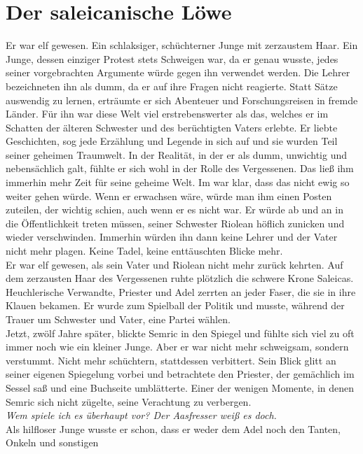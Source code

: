 
\chapter{Der saleicanische Löwe}
Er war elf gewesen. Ein schlaksiger, schüchterner Junge mit zerzaustem Haar. Ein Junge, dessen 
einziger Protest stets Schweigen war, da er genau wusste, jedes seiner vorgebrachten Argumente würde 
gegen ihn verwendet werden. Die Lehrer bezeichneten ihn als dumm, da er auf ihre Fragen nicht 
reagierte. Statt Sätze auswendig zu lernen, erträumte er sich Abenteuer und Forschungsreisen in 
fremde Länder. Für ihn war diese Welt viel erstrebenswerter als das, welches er im Schatten der 
älteren Schwester und des berüchtigten Vaters erlebte. Er liebte Geschichten, sog jede Erzählung und 
Legende in sich auf und sie wurden Teil seiner geheimen Traumwelt. In der Realität, in der er als 
dumm, unwichtig und nebensächlich galt, fühlte er sich wohl in der Rolle des Vergessenen. Das ließ 
ihm immerhin mehr Zeit für seine geheime Welt. Im war klar, dass das nicht ewig so weiter gehen 
würde. Wenn er erwachsen wäre, würde man ihm einen Posten zuteilen, der wichtig schien, auch wenn er 
es nicht war. Er würde ab und an in die Öffentlichkeit treten müssen, seiner Schwester Riolean 
höflich zunicken und wieder verschwinden. Immerhin würden ihn dann keine Lehrer und der Vater nicht 
mehr plagen. Keine Tadel, keine enttäuschten Blicke mehr.\\
Er war elf gewesen, als sein Vater und Riolean nicht mehr zurück kehrten. Auf dem zerzausten Haar 
des Vergessenen ruhte plötzlich die schwere Krone Saleicas. Heuchlerische Verwandte, Priester und 
Adel zerrten an jeder Faser, die sie in ihre Klauen bekamen. Er wurde zum Spielball der Politik und 
musste, während der Trauer um Schwester und Vater, eine Partei wählen.\\
Jetzt, zwölf Jahre später, blickte Semric in den Spiegel und fühlte sich viel zu oft immer noch wie 
ein kleiner Junge. Aber er war nicht mehr schweigsam, sondern verstummt. Nicht mehr schüchtern, 
stattdessen verbittert. Sein Blick glitt an seiner eigenen Spiegelung vorbei und betrachtete den 
Priester, der gemächlich im Sessel saß und eine Buchseite umblätterte. Einer der wenigen Momente, 
in denen Semric sich nicht zügelte, seine Verachtung zu verbergen. \\
\textit{Wem spiele ich es überhaupt vor? Der Aasfresser weiß es doch.}\\
Als hilfloser Junge wusste er schon, dass er weder dem Adel noch den Tanten, Onkeln und sonstigen 

